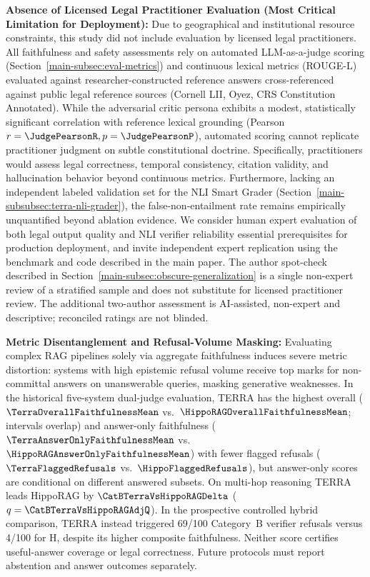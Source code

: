 \item \textbf{Absence of Licensed Legal Practitioner Evaluation (Most Critical Limitation for Deployment):} Due to geographical and institutional resource constraints, this study did not include evaluation by licensed legal practitioners. All faithfulness and safety assessments rely on automated LLM-as-a-judge scoring (Section~\ref{main-subsec:eval-metrics}) and continuous lexical metrics (ROUGE-L) evaluated against researcher-constructed reference answers cross-referenced against public legal reference sources (Cornell LII, Oyez, CRS Constitution Annotated). While the adversarial critic persona exhibits a modest, statistically significant correlation with reference lexical grounding (Pearson $r = \JudgePearsonR, p = \JudgePearsonP$), automated scoring cannot replicate practitioner judgment on subtle constitutional doctrine. Specifically, practitioners would assess legal correctness, temporal consistency, citation validity, and hallucination behavior beyond continuous metrics. Furthermore, lacking an independent labeled validation set for the NLI Smart Grader (Section~\ref{main-subsubsec:terra-nli-grader}), the false-non-entailment rate remains empirically unquantified beyond ablation evidence. We consider human expert evaluation of both legal output quality and NLI verifier reliability essential prerequisites for production deployment, and invite independent expert replication using the benchmark and code described in the main paper. The author spot-check described in Section~\ref{main-subsec:obscure-generalization} is a single non-expert review of a stratified sample and does not substitute for licensed practitioner review. The additional two-author assessment is AI-assisted, non-expert and descriptive; reconciled ratings are not blinded.

\item \textbf{Metric Disentanglement and Refusal-Volume Masking:} Evaluating complex RAG pipelines solely via aggregate faithfulness induces severe metric distortion: systems with high epistemic refusal volume receive top marks for non-committal answers on unanswerable queries, masking generative weaknesses. In the historical five-system dual-judge evaluation, TERRA has the highest overall ($\TerraOverallFaithfulnessMean$ vs.\ $\HippoRAGOverallFaithfulnessMean$; intervals overlap) and answer-only faithfulness ($\TerraAnswerOnlyFaithfulnessMean$ vs.\ $\HippoRAGAnswerOnlyFaithfulnessMean$) with fewer flagged refusals ($\TerraFlaggedRefusals$ vs.\ $\HippoFlaggedRefusals$), but answer-only scores are conditional on different answered subsets. On multi-hop reasoning TERRA leads HippoRAG by $\CatBTerraVsHippoRAGDelta$ ($q=\CatBTerraVsHippoRAGAdjQ$). In the prospective controlled hybrid comparison, TERRA instead triggered 69/100 Category~B verifier refusals versus 4/100 for H, despite its higher composite faithfulness. Neither score certifies useful-answer coverage or legal correctness. Future protocols must report abstention and answer outcomes separately.

